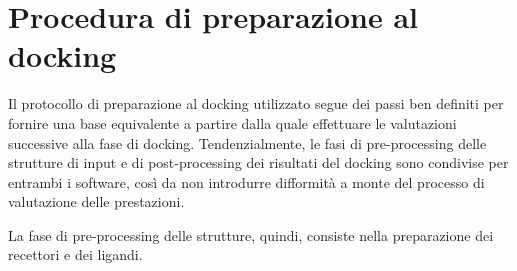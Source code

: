 \section{Procedura di preparazione al docking} \label{preparation}
Il protocollo di preparazione al docking utilizzato segue dei passi ben definiti per fornire una base equivalente a partire dalla quale effettuare le valutazioni successive alla fase di docking. Tendenzialmente, le fasi di pre-processing delle strutture di input e di post-processing dei risultati del docking sono condivise per entrambi i software, così da non introdurre difformità a monte del processo di valutazione delle prestazioni. 

La fase di pre-processing delle strutture, quindi, consiste nella preparazione dei recettori e dei ligandi.

\begin{table}[H]
\centering
{}
\end{table}
